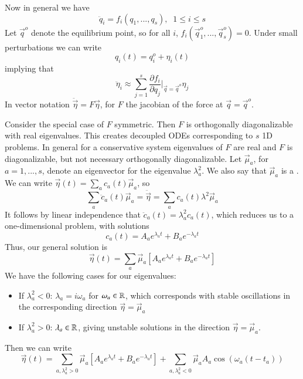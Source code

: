 \documentclass[12pt, a4paper, oneside, openright, titlepage]{book}
\begin{document}
Now in general we have $$\ddot{q}_i = f_i(q_1,...,q_s),\;\;1\leq i\leq s$$ Let $\vec{q}^o$ denote the equilibrium point, so for all $i$, $f_i(\vec{q}_1^o,...,\vec{q}_s^o) = 0$. Under small perturbations we can write \begin{equation*}
    q_i(t) = q_i^o+\eta_i(t)
\end{equation*}
implying that \begin{equation*}
    \ddot{\eta}_i \approx \sum_{j=1}^s\frac{\partial f_i}{\partial q_j}\Bigg\rvert_{\vec{q}=\vec{q}^o}\eta_j
\end{equation*}
In vector notation $\ddot{\vec{\eta}} = F\vec{\eta}$, for $F$ the jacobian of the force at $\vec{q}=\vec{q}^o$.

Consider the special case of $F$ symmetric. Then $F$ is orthogonally diagonalizable with real eigenvalues. This creates decoupled ODEs corresponding to $s$ 1D problems. In general for a conservative system eigenvalues of $F$ are real and $F$ is diagonalizable, but not necessary orthogonally diagonalizable. Let $\vec{\mu}_a$, for $a = 1,...,s$, denote an eigenvector for the eigenvalue $\lambda_a^2$. We also say that $\vec{\mu}_a$ is a . We can write $\vec{\eta}(t) = \sum_ac_a(t)\vec{\mu}_a$, so $$\sum_a\ddot{c}_a(t)\vec{\mu}_a = \ddot{\vec{\eta}} = \sum_ac_a(t)\lambda^2\vec{\mu}_a$$
It follows by linear independence that $\ddot{c}_a(t) = \lambda_a^2c_a(t)$, which reduces us to a one-dimensional problem, with solutions \begin{equation*}
    c_a(t) = A_ae^{\lambda_at} + B_ae^{-\lambda_at}
\end{equation*}
Thus, our general solution is \begin{equation*}
    \vec{\eta}(t) = \sum_a\vec{\mu}_a\left[A_ae^{\lambda_at} + B_ae^{-\lambda_at}\right]
\end{equation*}
We have the following cases for our eigenvalues: \begin{itemize}
    \item If $\lambda_a^2 < 0$: $\lambda_a = i\omega_a$ for $\omega_a \in \mathbb R$, which corresponds with stable oscillations in the corresponding direction $\vec{\eta} = \vec{\mu}_a$
    \item If $\lambda_a^2 > 0$: $\lambda_a \in \mathbb R$, giving unstable solutions in the direction $\vec{\eta} = \vec{\mu}_a$.
\end{itemize}
Then we can write \begin{equation*}
    \vec{\eta}(t) = \sum_{a,\lambda_a^2>0}\vec{\mu}_a\left[A_ae^{\lambda_at} + B_ae^{-\lambda_at}\right] + \sum_{a,\lambda_a^2 < 0}\vec{\mu}_aA_a\cos(\omega_a(t-t_a))
\end{equation*}
\end{document}
